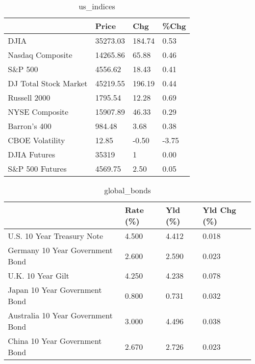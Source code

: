 \documentclass{article}%
\begin{document}
%


\begin{table}[htbp]%
\caption{us\_indices}%
\centering%
\begin{adjustbox}{width=1\textwidth}%
\begin{tabular}{llll}
\toprule
                      &    Price &    Chg &  \%Chg \\
\midrule
                 DJIA & 35273.03 & 184.74 &  0.53 \\
     Nasdaq Composite & 14265.86 &  65.88 &  0.46 \\
              S\&P 500 &  4556.62 &  18.43 &  0.41 \\
DJ Total Stock Market & 45219.55 & 196.19 &  0.44 \\
         Russell 2000 &  1795.54 &  12.28 &  0.69 \\
       NYSE Composite & 15907.89 &  46.33 &  0.29 \\
         Barron's 400 &   984.48 &   3.68 &  0.38 \\
      CBOE Volatility &    12.85 &  -0.50 & -3.75 \\
         DJIA Futures &    35319 &      1 &  0.00 \\
      S\&P 500 Futures &  4569.75 &   2.50 &  0.05 \\
\bottomrule
\end{tabular}
%
\end{adjustbox}%
\end{table}

%


\begin{table}[htbp]%
\caption{global\_bonds}%
\centering%
\begin{adjustbox}{width=1\textwidth}%
\begin{tabular}{llll}
\toprule
                                  & Rate (\%) & Yld (\%) & Yld Chg (\%) \\
\midrule
       U.S. 10 Year Treasury Note &    4.500 &   4.412 &       0.018 \\
  Germany 10 Year Government Bond &    2.600 &   2.590 &       0.023 \\
                U.K. 10 Year Gilt &    4.250 &   4.238 &       0.078 \\
    Japan 10 Year Government Bond &    0.800 &   0.731 &       0.032 \\
Australia 10 Year Government Bond &    3.000 &   4.496 &       0.038 \\
    China 10 Year Government Bond &    2.670 &   2.726 &       0.023 \\
\bottomrule
\end{tabular}
%
\end{adjustbox}%
\end{table}
\end{document}

